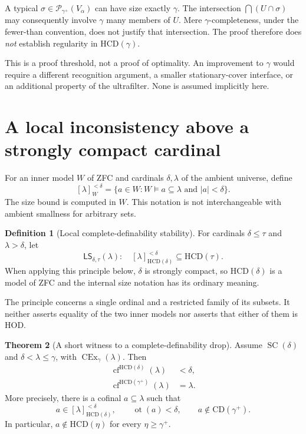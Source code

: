 \documentclass[11pt,letterpaper]{article}
\theoremstyle{definition}
\newtheorem{definition}{Definition}[section]
\newtheorem{theorem}[definition]{Theorem}
\newcommand{\SC}{\operatorname{SC}}
\newcommand{\CEx}{\operatorname{CEx}}
\newcommand{\cf}{\operatorname{cf}}
\newcommand{\ot}{\operatorname{ot}}
\newcommand{\CD}{\mathrm{CD}}
\newcommand{\HCD}{\mathrm{HCD}}
\newcommand{\PP}{\mathcal P}
\newcommand{\LS}{\mathsf{LS}}
\newcommand{\powersmall}[3]{[#1]^{<#2}_{#3}}
\begin{document}
A typical $\sigma\in\PP_{\gamma^+}(V_\alpha)$ can have size exactly $\gamma$. The intersection $\bigcap(U\cap\sigma)$ may consequently involve $\gamma$ many members of $U$. Mere $\gamma$-completeness, under the fewer-than convention, does not justify that intersection. The proof therefore does \emph{not} establish regularity in $\HCD(\gamma)$.

This is a proof threshold, not a proof of optimality. An improvement to $\gamma$ would require a different recognition argument, a smaller stationary-cover interface, or an additional property of the ultrafilter. None is assumed implicitly here.

\section{A local inconsistency above a strongly compact cardinal}\label{sec:jump}

For an inner model $W$ of ZFC and cardinals $\delta,\lambda$ of the ambient universe, define
\[
 \powersmall{\lambda}{\delta}{W}
   =\{a\in W:W\models a\subseteq\lambda\text{ and }|a|<\delta\}.
\]
The size bound is computed in $W$. This notation is not interchangeable with ambient smallness for arbitrary sets.

\begin{definition}[Local complete-definability stability]\label{def:local-stability}
For cardinals $\delta\leq\tau$ and $\lambda>\delta$, let
\begin{equation}\label{eq:LS}
 \LS_{\delta,\tau}(\lambda):\quad
 \powersmall{\lambda}{\delta}{\HCD(\delta)}
       \subseteq\HCD(\tau).
\end{equation}
When applying this principle below, $\delta$ is strongly compact, so $\HCD(\delta)$ is a model of ZFC and the internal size notation has its ordinary meaning.
\end{definition}

The principle concerns a single ordinal and a restricted family of its subsets. It neither asserts equality of the two inner models nor asserts that either of them is HOD.

\begin{theorem}[A short witness to a complete-definability drop]\label{thm:jump}
Assume $\SC(\delta)$ and $\delta<\lambda\leq\gamma$, with $\CEx_\gamma(\lambda)$. Then
\begin{align}
 \cf^{\HCD(\delta)}(\lambda)&<\delta,\label{eq:lowcf}\\
 \cf^{\HCD(\gamma^+)}(\lambda)&=\lambda.\label{eq:highcf}
\end{align}
More precisely, there is a cofinal $a\subseteq\lambda$ such that
\begin{equation}\label{eq:separation}
 a\in\powersmall{\lambda}{\delta}{\HCD(\delta)},\qquad
 \ot(a)<\delta,\qquad
 a\notin\CD(\gamma^+).
\end{equation}
In particular, $a\notin\HCD(\eta)$ for every $\eta\geq\gamma^+$.
\end{theorem}
\end{document}
